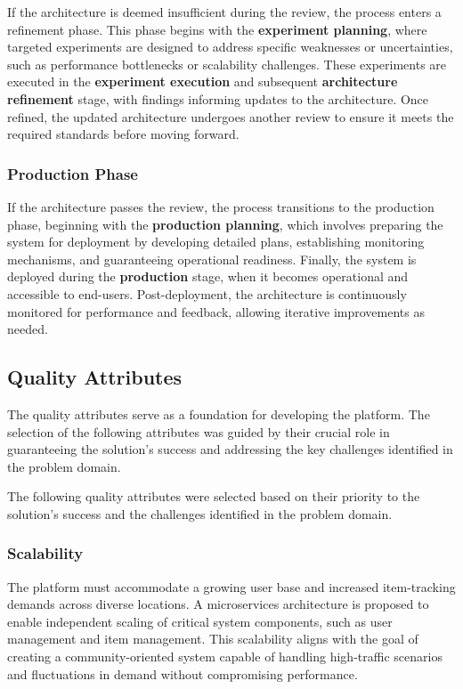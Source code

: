 If the architecture is deemed insufficient during the review, the process enters a refinement phase. This phase begins with the \textbf{experiment planning}, where targeted experiments are designed to address specific weaknesses or uncertainties, such as performance bottlenecks or scalability challenges. These experiments are executed in the \textbf{experiment execution} and subsequent \textbf{architecture refinement} stage, with findings informing updates to the architecture. Once refined, the updated architecture undergoes another review to ensure it meets the required standards before moving forward.

\subsubsection{Production Phase}

If the architecture passes the review, the process transitions to the production phase, beginning with the \textbf{production planning}, which involves preparing the system for deployment by developing detailed plans, establishing monitoring mechanisms, and guaranteeing operational readiness. Finally, the system is deployed during the \textbf{production} stage, when it becomes operational and accessible to end-users. Post-deployment, the architecture is continuously monitored for performance and feedback, allowing iterative improvements as needed.


\subsection{Quality Attributes} \label{section:quality_attributes}

The quality attributes serve as a foundation for developing the platform. The selection of the following attributes was guided by their crucial role in guaranteeing the solution's success and addressing the key challenges identified in the problem domain.

The following quality attributes were selected based on their priority to the solution's success and the challenges identified in the problem domain.

\subsubsection{Scalability}

The platform must accommodate a growing user base and increased item-tracking demands across diverse locations. A microservices architecture is proposed to enable independent scaling of critical system components, such as user management and item management. This scalability aligns with the goal of creating a community-oriented system capable of handling high-traffic scenarios and fluctuations in demand without compromising performance.


